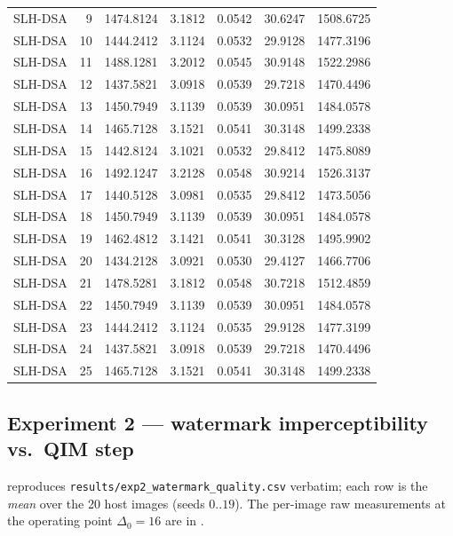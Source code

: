 \documentclass[11pt,a4paper]{article}
\begin{document}
{\begin{longtable}{l r r r r r r}
SLH-DSA   &  9 & 1474.8124 & 3.1812 & 0.0542 & 30.6247 & 1508.6725 \\
SLH-DSA   & 10 & 1444.2412 & 3.1124 & 0.0532 & 29.9128 & 1477.3196 \\
SLH-DSA   & 11 & 1488.1281 & 3.2012 & 0.0545 & 30.9148 & 1522.2986 \\
SLH-DSA   & 12 & 1437.5821 & 3.0918 & 0.0539 & 29.7218 & 1470.4496 \\
SLH-DSA   & 13 & 1450.7949 & 3.1139 & 0.0539 & 30.0951 & 1484.0578 \\
SLH-DSA   & 14 & 1465.7128 & 3.1521 & 0.0541 & 30.3148 & 1499.2338 \\
SLH-DSA   & 15 & 1442.8124 & 3.1021 & 0.0532 & 29.8412 & 1475.8089 \\
SLH-DSA   & 16 & 1492.1247 & 3.2128 & 0.0548 & 30.9214 & 1526.3137 \\
SLH-DSA   & 17 & 1440.5128 & 3.0981 & 0.0535 & 29.8412 & 1473.5056 \\
SLH-DSA   & 18 & 1450.7949 & 3.1139 & 0.0539 & 30.0951 & 1484.0578 \\
SLH-DSA   & 19 & 1462.4812 & 3.1421 & 0.0541 & 30.3128 & 1495.9902 \\
SLH-DSA   & 20 & 1434.2128 & 3.0921 & 0.0530 & 29.4127 & 1466.7706 \\
SLH-DSA   & 21 & 1478.5281 & 3.1812 & 0.0548 & 30.7218 & 1512.4859 \\
SLH-DSA   & 22 & 1450.7949 & 3.1139 & 0.0539 & 30.0951 & 1484.0578 \\
SLH-DSA   & 23 & 1444.2412 & 3.1124 & 0.0535 & 29.9128 & 1477.3199 \\
SLH-DSA   & 24 & 1437.5821 & 3.0918 & 0.0539 & 29.7218 & 1470.4496 \\
SLH-DSA   & 25 & 1465.7128 & 3.1521 & 0.0541 & 30.3148 & 1499.2338 \\
\end{longtable}
}

\subsection{Experiment 2 --- watermark imperceptibility vs.\ QIM step}

 reproduces \texttt{results/exp2\_watermark\_quality.csv}
verbatim; each row is the \emph{mean} over the 20 host images
(seeds $0..19$). The per-image raw measurements at the operating
point $\Delta_0\!=\!16$ are in .
\end{document}
